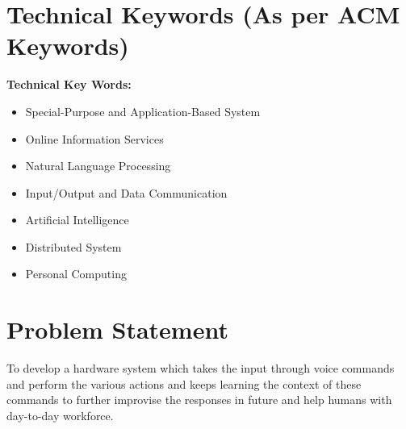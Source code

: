 \documentclass[oneside,a4paper,12pt]{article}
\begin{document}
\section{Technical Keywords (As per ACM Keywords)}
 {\bfseries Technical Key Words:}      
 \begin{itemize}
 \item 	Special-Purpose and Application-Based System
 \item	Online Information Services
 \item  Natural Language Processing
 \item  Input/Output and Data Communication
 \item  Artificial Intelligence
 \item  Distributed System
 \item  Personal Computing
 \end{itemize}
%	  
%
%	



\section{Problem Statement}
\label{sec:problem}
To develop a hardware system which takes the input through voice commands and perform the various actions and keeps learning the context of these commands to further improvise the responses in future and help humans with day-to-day workforce.
\end{document}

